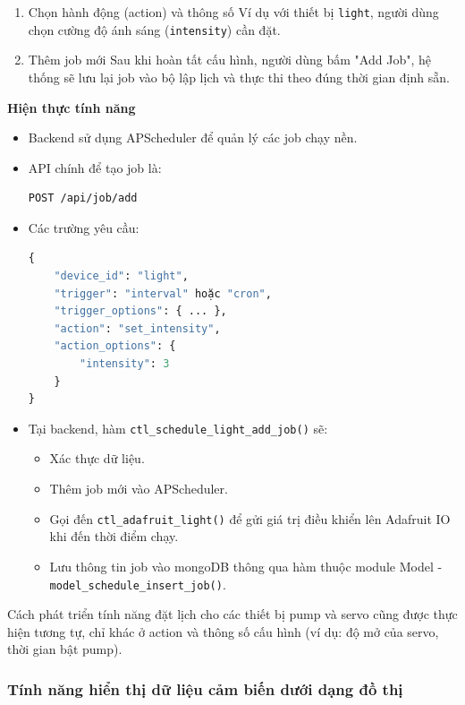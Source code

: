 \begin{enumerate}
    \item Chọn hành động (action) và thông số \newline
    Ví dụ với thiết bị \texttt{light}, người dùng chọn cường độ ánh sáng (\texttt{intensity}) cần đặt.
    
    \item Thêm job mới \newline
    Sau khi hoàn tất cấu hình, người dùng bấm "Add Job", hệ thống sẽ lưu lại job vào bộ lập lịch và thực thi theo đúng thời gian định sẵn.
\end{enumerate}

\textbf{Hiện thực tính năng}
\begin{itemize}
    \item Backend sử dụng APScheduler để quản lý các job chạy nền.

    \item API chính để tạo job là:
    \begin{lstlisting}[language=bash]
POST /api/job/add
    \end{lstlisting}
    \item Các trường yêu cầu:
    \begin{lstlisting}[language=Python]
{
    "device_id": "light",
    "trigger": "interval" hoặc "cron",
    "trigger_options": { ... },
    "action": "set_intensity",
    "action_options": {
        "intensity": 3
    }
}
    \end{lstlisting}
    \item Tại backend, hàm \texttt{ctl\_schedule\_light\_add\_job()} sẽ:
    \begin{itemize}
        \item Xác thực dữ liệu.
        \item Thêm job mới vào APScheduler.
        \item Gọi đến \texttt{ctl\_adafruit\_light()} để gửi giá trị điều khiển lên Adafruit IO khi đến thời điểm chạy.
        \item Lưu thông tin job vào mongoDB thông qua hàm thuộc module \newline Model - \texttt{model\_schedule\_insert\_job()}.
    \end{itemize}
\end{itemize}

Cách phát triển tính năng đặt lịch cho các thiết bị pump và servo cũng được thực hiện tương tự, chỉ khác ở action và thông số cấu hình (ví dụ: độ mở của servo, thời gian bật pump).

\subsubsection{Tính năng hiển thị dữ liệu cảm biến dưới dạng đồ thị}

